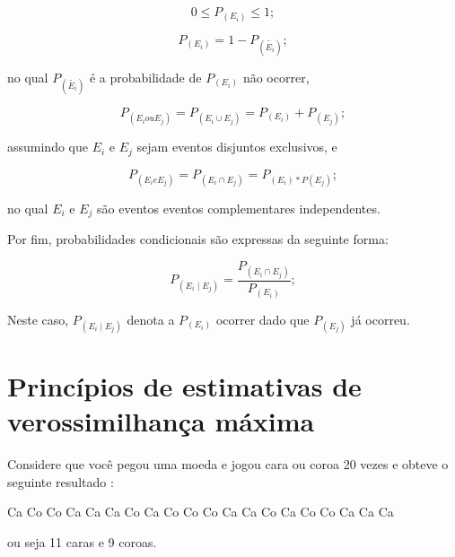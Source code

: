 \begin{refsection}
\begin{center}
\begin{equation}
0 \leq P_{(E_{i})} \leq 1;
\end{equation}
\end{center}

\begin{center}
\begin{equation}
P_{(E_{i})} = 1 - P_{(\tilde{E_{i}})};
\end{equation}
\end{center}

no qual $P_{(\tilde{E_{i}})}$ é a probabilidade de $P_{(E_{i})}$ não ocorrer,

\begin{center}
\begin{equation}
P_{(E_{i} { }ou{ } E_{j})} = P_{(E_{i} \cup E_{j})} = P_{(E_{i})} + P_{(E_{j})};
\end{equation}
\end{center}

assumindo que $E_{i}$ e $E_{j}$ sejam eventos disjuntos exclusivos, e

\begin{center}
\begin{equation}\label{eq:mult}
P_{(E_{i} e E_{j})} = P_{(E_{i} \cap E_{j})} = P_{(E_{i}) * P(E_{j})};
\end{equation}
\end{center}

no qual $E_{i}$ e $E_{j}$ são eventos eventos complementares independentes.

Por fim, probabilidades condicionais são expressas da seguinte forma:

\begin{center}
\begin{equation}
P_{(E_{i} \mid E_{j})} = \frac{P_{(E_{i} \cap E_{j})}}{P_{(E_{i})}};
\end{equation}
\end{center}

Neste caso, $P_{(E_{i} \mid E_{j})}$ denota a $P_{(E_{i})}$ ocorrer dado que $P_{(E_{j})}$ já ocorreu.
\\

\section{Princípios de estimativas de verossimilhança máxima}\label{tut12:estimate_ml}

Considere que você pegou uma moeda e jogou cara ou coroa 20 vezes e obteve o seguinte resultado \parencite[o mesmo exemplo é dado utilizando dictribuição binomial no Apêndice A de][]{anderson_2008}:
\begin{center}
Ca Co Co Ca Ca Ca Co Ca Co Co Co Ca Ca Co Ca Co Co Ca Ca Ca
\end{center}
ou seja 11 caras e 9 coroas. 


\end{refsection}
